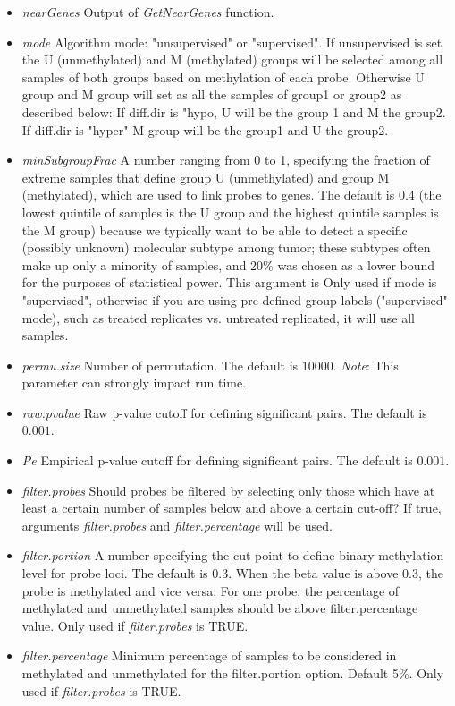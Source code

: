\begin{itemize}
\item \textit{nearGenes} Output of \textit{GetNearGenes} function.
\item  \textit{mode} Algorithm mode: "unsupervised" or "supervised". If unsupervised is set
the U (unmethylated) and M (methylated) groups will be selected
among all samples of both groups based on methylation of each probe.
Otherwise U group and M group will set as all the samples of group1 or group2 as described below:
If diff.dir is "hypo, U will be the group 1 and M the group2.
If diff.dir is "hyper" M group will be the group1 and U the group2.
\item \textit{minSubgroupFrac} A number ranging from 0 to 1, specifying the fraction of extreme  samples that define group U (unmethylated) and group M (methylated), which are used to link probes to genes. The default is 0.4 (the lowest quintile of samples is the U group and the highest quintile samples is the M group) because we typically want to be able to detect a specific (possibly unknown) molecular subtype among tumor; these subtypes often make up only a minority of samples, and 20\% was chosen as a lower bound for the purposes of statistical power. This argument is Only used if mode is "supervised", otherwise if you are using pre-defined group labels ("supervised" mode), such as treated replicates vs. untreated replicated, it will use all samples.
\item  \textit{permu.size} Number of permutation. The default is $10000$. \textit{Note}: This parameter can strongly impact run time.
\item \textit{raw.pvalue} Raw p-value cutoff for defining significant pairs. The default is $0.001$.
\item \textit{Pe} Empirical p-value cutoff for defining significant pairs. The default is $0.001$.
\item \textit{filter.probes} Should probes be filtered  by selecting only those which have at least a certain number of samples below and above a certain cut-off? If true, arguments \textit{filter.probes} and \textit{filter.percentage} will be used.
\item  \textit{filter.portion}	A number specifying the cut point to define binary methylation level for probe loci. The default is 0.3. When the beta value is above 0.3, the probe is methylated and vice versa. For one probe, the percentage of methylated and unmethylated samples should be above filter.percentage value. Only used if \textit{filter.probes} is TRUE.
\item  \textit{filter.percentage}	Minimum percentage of samples to be considered in methylated and unmethylated for the filter.portion option. Default 5\%. Only used if \textit{filter.probes} is TRUE.
\end{itemize}


